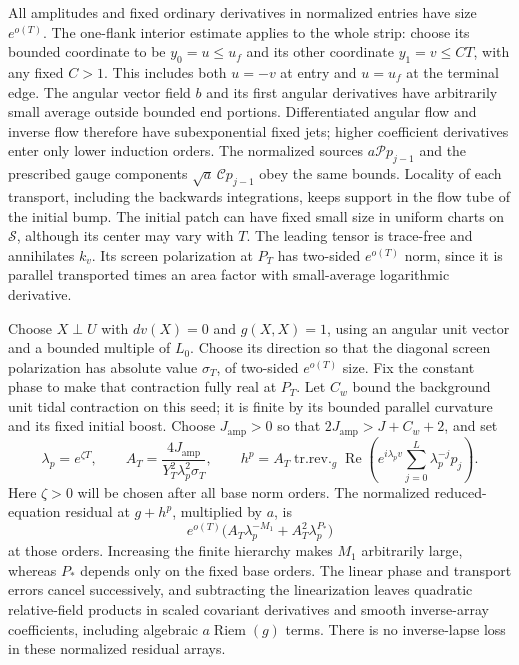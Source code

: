 All amplitudes and fixed ordinary derivatives in normalized entries
have size $e^{o(T)}$. The one-flank interior estimate applies to the
whole strip: choose its bounded coordinate to be $y_0=u\le u_f$
and its other coordinate $y_1=v\le CT$, with any fixed $C>1$.
This includes both $u=-v$ at entry and $u=u_f$ at the terminal edge.
The angular vector field $b$ and its first angular derivatives have
arbitrarily small average outside bounded end portions. Differentiated angular flow
and inverse flow therefore have subexponential fixed jets; higher
coefficient derivatives enter only lower induction orders. The
normalized sources $a\mathcal Pp_{j-1}$ and the prescribed gauge
components $\sqrt a\,\mathcal Cp_{j-1}$ obey the same bounds.
Locality of each transport, including the backwards integrations,
keeps support in the flow tube of the initial bump. The initial
patch can have fixed small size in uniform charts on $\mathcal S$,
although its center may vary with $T$. The leading tensor is
trace-free and annihilates $k_v$. Its screen polarization at $P_T$
has two-sided $e^{o(T)}$ norm, since it is parallel transported times
an area factor with small-average logarithmic derivative.

Choose $X\perp U$ with $dv(X)=0$ and $g(X,X)=1$, using an angular
unit vector and a bounded multiple of $L_0$. Choose its direction so
that the diagonal screen polarization has absolute value
$\sigma_T$, of two-sided $e^{o(T)}$ size. Fix the constant phase
to make that contraction fully real at $P_T$. Let $C_w$ bound the
background unit tidal contraction on this seed; it is finite by its
bounded parallel curvature and its fixed initial boost. Choose
$J_{\mathrm{amp}}>0$ so that $2J_{\mathrm{amp}}>J+C_w+2$, and set
\begin{equation}
 \lambda_p=e^{\zeta T},\qquad
 A_T=\frac{4J_{\mathrm{amp}}}{Y_T^2\lambda_p^2\sigma_T},\qquad
 h^p=A_T\operatorname{tr.rev.}_g
       \operatorname{Re}\left(e^{i\lambda_pv}
                    \sum_{j=0}^L\lambda_p^{-j}p_j\right).
 \label{pk2:packet-amplitude}
\end{equation}
Here $\zeta>0$ will be chosen after all base norm orders. The normalized
reduced-equation residual at $g+h^p$, multiplied by $a$, is
\begin{equation}
 e^{o(T)}\bigl(A_T\lambda_p^{-M_1}
                     +A_T^2\lambda_p^{P_*}\bigr)
 \label{pk2:deep-residual}
\end{equation}
at those orders. Increasing the finite hierarchy makes $M_1$ arbitrarily
large, whereas $P_*$ depends only on the fixed base orders. The linear
phase and transport errors cancel successively,
and subtracting the linearization leaves quadratic relative-field
products in scaled covariant derivatives and smooth inverse-array
coefficients, including algebraic $a\operatorname{Riem}(g)$ terms.
There is no inverse-lapse loss in these normalized residual arrays.

